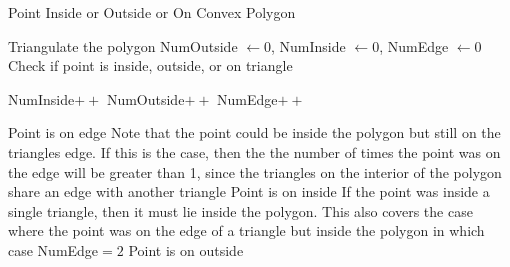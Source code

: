 \documentclass[a4paper,10pt]{scrartcl}
\begin{document}
\begin{algorithm}[!h]
  \caption{Point Inside or Outside or On Convex Polygon}\label{}
  \begin{algorithmic}
    \State Triangulate the polygon
    \State NumOutside $\gets 0$, NumInside $\gets 0$, NumEdge $\gets 0$
      \State Check if point is inside, outside, or on triangle
      
	\State NumInside$++$
	\State NumOutside$++$
      \Else
	\State NumEdge$++$
      \EndIf
    \EndFor
    
      \State Point is on edge 
      \Comment Note that the point could be inside the polygon but still on the triangles edge. If this is the case,
      then the the number of times the point was on the edge will be greater than 1, since the triangles on the interior of
      the polygon share an edge with another triangle
      \State Point is on inside
      \Comment If the point was inside a single triangle, then it must lie inside the polygon. This also
      covers the case where the point was on the edge of a triangle but inside the polygon in which case NumEdge$ = 2  $
    \Else
      \State Point is on outside
    \EndIf
  \end{algorithmic}
\end{algorithm}
\end{document}
